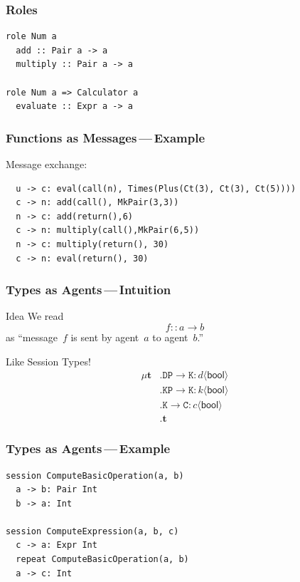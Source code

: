 \documentclass{beamer}
\begin{document}
\begin{frame}[fragile]
\frametitle{Roles}
\begin{lstlisting}
role Num a
  add :: Pair a -> a
  multiply :: Pair a -> a

role Num a => Calculator a
  evaluate :: Expr a -> a
\end{lstlisting}
\end{frame}

\begin{frame}[fragile]
\frametitle{Functions as Messages\,---\,Example}
Message exchange:
\begin{lstlisting}
  u -> c: eval(call(n), Times(Plus(Ct(3), Ct(3), Ct(5))))
  c -> n: add(call(), MkPair(3,3))
  n -> c: add(return(),6)
  c -> n: multiply(call(),MkPair(6,5))
  n -> c: multiply(return(), 30)
  c -> n: eval(return(), 30)
\end{lstlisting}
\note[item]{}
\end{frame}

\begin{frame}[fragile]
\frametitle{Types as Agents\,---\,Intuition}
\begin{block}{Idea}
We read \[f :: a \to b\] as
``message~$f$ is sent by agent~$a$ to agent~$b$.''
\end{block}
\begin{block}{Like Session Types!}
\begin{align*}
\mu\mathbf{t}&.\mathtt{DP}\to\mathtt{K}:d\langle\mathsf{bool}\rangle \\
  &.\mathtt{KP}\to\mathtt{K}:k\langle\mathsf{bool}\rangle\\
  &.\mathtt{K}\to\mathtt{C}:c\langle\mathsf{bool}\rangle\\
  &.\mathbf{t}
\end{align*}
\end{block}
\note[item]{}
\end{frame}

\begin{frame}[fragile]
\frametitle{Types as Agents\,---\,Example}
\begin{lstlisting}
session ComputeBasicOperation(a, b)
  a -> b: Pair Int
  b -> a: Int

session ComputeExpression(a, b, c)
  c -> a: Expr Int
  repeat ComputeBasicOperation(a, b)
  a -> c: Int
\end{lstlisting}
\note[item]{}
\end{frame}
\end{document}

